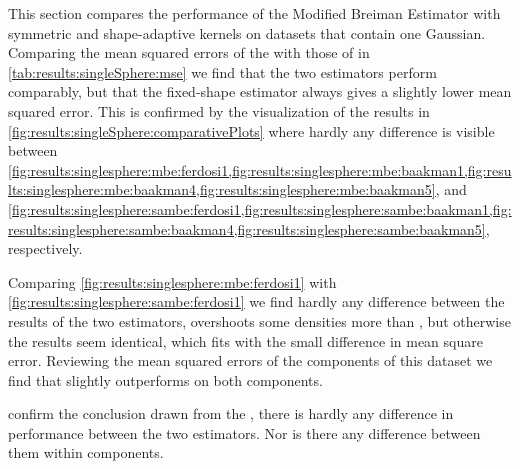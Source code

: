 
\begin{figure*}
	\centering
	
	\caption{Plot of the density as estimated by - \mbe and - \sambe as a function of the known density of the datasets with a single Gaussian.}
	\label{fig:results:singleSphere:comparativePlots}
\end{figure*}

\begin{table}
	\centering
	
	\caption{Performance of the Modified Breiman Estimator with fixed-shaped and shape-adaptive kernels on the datasets with a single Gaussian.} 	
	\label{tab:results:singleSphere:mse}
\end{table}

This section compares the performance of the Modified Breiman Estimator with symmetric and shape-adaptive kernels on datasets that contain one Gaussian. Comparing the mean squared errors of the \mbe with those of \sambe in \cref{tab:results:singleSphere:mse} we find that the two estimators perform comparably, but that the fixed-shape estimator always gives a slightly lower mean squared error. This is confirmed by the visualization of the results in \cref{fig:results:singleSphere:comparativePlots} where hardly any difference is visible between \cref{fig:results:singlesphere:mbe:ferdosi1,fig:results:singlesphere:mbe:baakman1,fig:results:singlesphere:mbe:baakman4,fig:results:singlesphere:mbe:baakman5}, and \cref{fig:results:singlesphere:sambe:ferdosi1,fig:results:singlesphere:sambe:baakman1,fig:results:singlesphere:sambe:baakman4,fig:results:singlesphere:sambe:baakman5}, respectively.

		Comparing \cref{fig:results:singlesphere:mbe:ferdosi1} with \cref{fig:results:singlesphere:sambe:ferdosi1} we find hardly any difference between the results of the two estimators, \sambe overshoots some densities more than \mbe, but otherwise the results seem identical, which fits with the small difference in mean square error. 
		Reviewing the mean squared errors of the components of this dataset we find that \mbe slightly outperforms \sambe on both components.

		 confirm the conclusion drawn from the \MSE, there is hardly any difference in performance between the two estimators. 
		Nor is there any difference between them within components.

